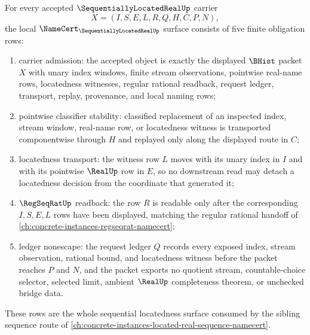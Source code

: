 \begin{theorem}
\label{thm:sequentially-located-real-namecert-obligations}
For every accepted $\SequentiallyLocatedRealUp$ carrier
$$
X=(I,S,E,L,R,Q,H,C,P,N),
$$
the local $\NameCert_{\SequentiallyLocatedRealUp}$ surface consists of five finite obligation rows:
\begin{enumerate}
\item carrier admission: the accepted object is exactly the displayed $\BHist$ packet $X$ with unary index windows, finite stream observations, pointwise real-name rows, locatedness witnesses, regular rational readback, request ledger, transport, replay, provenance, and local naming rows;
\item pointwise classifier stability: classified replacement of an inspected index, stream window, real-name row, or locatedness witness is transported componentwise through $H$ and replayed only along the displayed route in $C$;
\item locatedness transport: the witness row $L$ moves with its unary index in $I$ and with its pointwise $\RealUp$ row in $E$, so no downstream read may detach a locatedness decision from the coordinate that generated it;
\item $\RegSeqRatUp$ readback: the row $R$ is readable only after the corresponding $I,S,E,L$ rows have been displayed, matching the regular rational handoff of \autoref{ch:concrete-instances-regseqrat-namecert};
\item ledger nonescape: the request ledger $Q$ records every exposed index, stream observation, rational bound, and locatedness witness before the packet reaches $P$ and $N$, and the packet exports no quotient stream, countable-choice selector, selected limit, ambient $\RealUp$ completeness theorem, or unchecked bridge data.
\end{enumerate}
These rows are the whole sequential locatedness surface consumed by the sibling sequence route of \autoref{ch:concrete-instances-located-real-sequence-namecert}.
\end{theorem}


